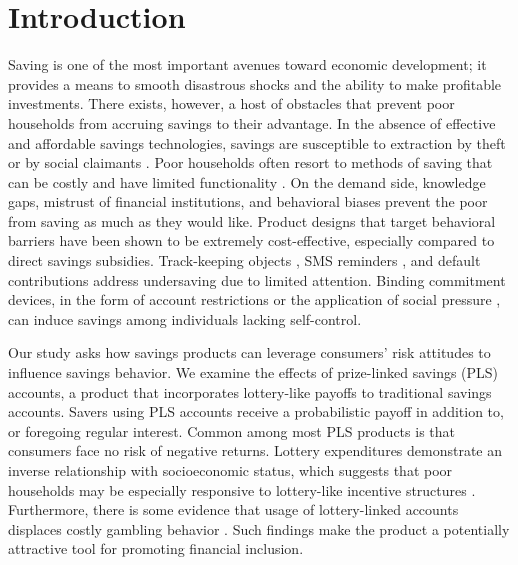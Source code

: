 \documentclass[11pt]{article}
\begin{document}
\newpage

\section{Introduction}

	Saving is one of the most important avenues toward economic development; it provides a means to smooth disastrous shocks and the ability to make profitable investments. There exists, however, a host of obstacles that prevent poor households from accruing savings to their advantage. In the absence of effective and affordable savings technologies, savings are susceptible to extraction by theft or by social claimants . Poor households often resort to methods of saving that can be costly and have limited functionality . On the demand side, knowledge gaps, mistrust of financial institutions, and behavioral biases prevent the poor from saving as much as they would like. Product designs that target behavioral barriers have been shown to be extremely cost-effective, especially compared to direct savings subsidies. Track-keeping objects , SMS reminders , and default contributions  address undersaving due to limited attention. Binding commitment devices, in the form of account restrictions  or the application of social pressure , can induce savings among individuals lacking self-control.

	Our study asks how savings products can leverage consumers' risk attitudes to influence savings behavior. We examine the effects of prize-linked savings (PLS) accounts, a product that incorporates lottery-like payoffs to traditional savings accounts. Savers using PLS accounts receive a probabilistic payoff in addition to, or foregoing regular interest. Common among most PLS products is that consumers face no risk of negative returns. Lottery expenditures demonstrate an inverse relationship with socioeconomic status, which suggests that poor households may be especially responsive to lottery-like incentive structures . Furthermore, there is some evidence that usage of lottery-linked accounts displaces costly gambling behavior . Such findings make the product a potentially attractive tool for promoting financial inclusion.
\end{document}
